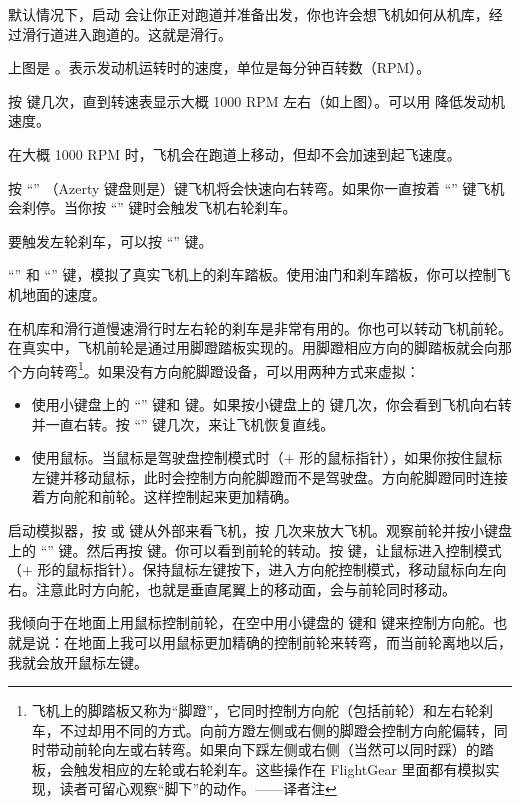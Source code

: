 默认情况下，启动 \FlightGear{} 会让你正对跑道并准备出发，你也许会想飞机如何从机库，经过滑行道进入跑道的。这就是滑行。

上图是 。表示发动机运转时的速度，单位是每分钟百转数（RPM）。

按  键几次，直到转速表显示大概 1000 RPM 左右（如上图）。可以用  降低发动机速度。

在大概 1000 RPM 时，飞机会在跑道上移动，但却不会加速到起飞速度。

按 “” （Azerty 键盘则是）键飞机将会快速向右转弯。如果你一直按着 “” 键飞机会刹停。当你按 “” 键时会触发飞机右轮刹车。

要触发左轮刹车，可以按 “\key{,}” 键。

“\key{,}” 和 “” 键，模拟了真实飞机上的刹车踏板。使用油门和刹车踏板，你可以控制飞机地面的速度。

在机库和滑行道慢速滑行时左右轮的刹车是非常有用的。你也可以转动飞机前轮。在真实中，飞机前轮是通过用脚蹬踏板实现的。用脚蹬相应方向的脚踏板就会向那个方向转弯\footnote{飞机上的脚踏板又称为“脚蹬”，它同时控制方向舵（包括前轮）和左右轮刹车，不过却用不同的方式。向前方蹬左侧或右侧的脚蹬会控制方向舵偏转，同时带动前轮向左或右转弯。如果向下踩左侧或右侧（当然可以同时踩）的踏板，会触发相应的左轮或右轮刹车。这些操作在 FlightGear 里面都有模拟实现，读者可留心观察“脚下”的动作。——译者注}。如果没有方向舵脚蹬设备，可以用两种方式来虚拟：
\begin{itemize}
    \item 使用小键盘上的 “” 键和  键。如果按小键盘上的  键几次，你会看到飞机向右转并一直右转。按 “” 键几次，来让飞机恢复直线。
    \item 使用鼠标。当鼠标是驾驶盘控制模式时（$+$ 形的鼠标指针），如果你按住鼠标左键并移动鼠标，此时会控制方向舵脚蹬而不是驾驶盘。方向舵脚蹬同时连接着方向舵和前轮。这样控制起来更加精确。
\end{itemize}

启动模拟器，按  或  键从外部来看飞机，按  几次来放大飞机。观察前轮并按小键盘上的 “” 键。然后再按  键。你可以看到前轮的转动。按  键，让鼠标进入控制模式（$+$ 形的鼠标指针）。保持鼠标左键按下，进入方向舵控制模式，移动鼠标向左向右。注意此时方向舵，也就是垂直尾翼上的移动面，会与前轮同时移动。

我倾向于在地面上用鼠标控制前轮，在空中用小键盘的  键和  键来控制方向舵。也就是说：在地面上我可以用鼠标更加精确的控制前轮来转弯，而当前轮离地以后，我就会放开鼠标左键。

